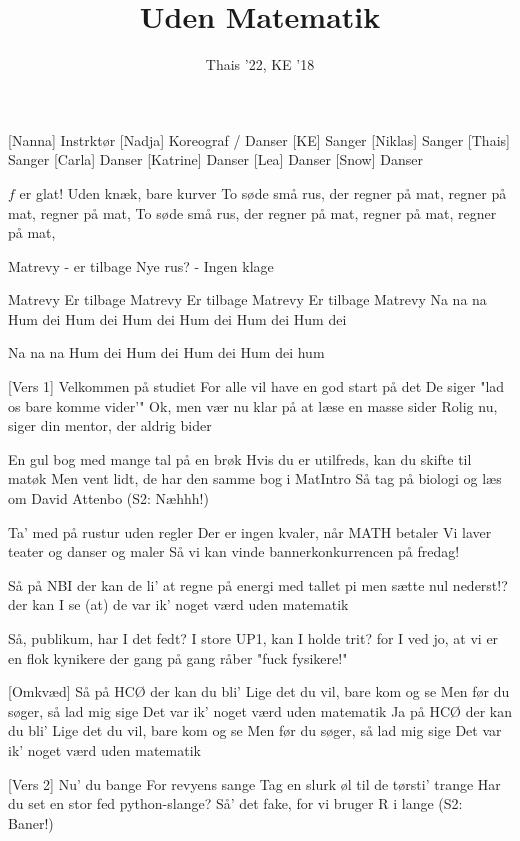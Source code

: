 \documentclass[a4paper,11pt]{article}
\title{Uden Matematik}
\author{Thais '22, KE '18}
\begin{document}
\maketitle

\begin{roles}
[Nanna] Instrktør
[Nadja] Koreograf / Danser
[KE] Sanger
[Niklas] Sanger
[Thais] Sanger
[Carla] Danser
[Katrine] Danser
[Lea] Danser
[Snow] Danser
\end{roles}

\begin{song}
  $f$ er glat! Uden knæk, bare kurver
  To søde små rus, der regner på mat, regner på mat, regner på mat, 
To søde små rus, der regner på mat, regner på mat, regner på mat,

%
Matrevy - er tilbage
Nye rus? - Ingen klage

Matrevy
Er tilbage
Matrevy
Er tilbage
Matrevy
Er tilbage
Matrevy
Na na na
Hum dei
Hum dei
Hum dei
Hum dei
Hum dei
Hum dei

Na na na
Hum dei
Hum dei
Hum dei
Hum dei hum

[Vers 1]%
Velkommen på studiet
For alle vil have en god start på det
De siger "lad os bare komme vider'"
Ok, men vær nu klar på at læse en masse sider
Rolig nu, siger din mentor, der aldrig bider

En gul bog med mange tal på en brøk
Hvis du er utilfreds, kan du skifte til matøk
Men vent lidt, de har den samme bog i MatIntro
Så tag på biologi og læs om David Attenbo  (S2: Næhhh!)

Ta' med på rustur uden regler
Der er ingen kvaler, når MATH betaler
Vi laver teater og danser og maler
Så vi kan vinde bannerkonkurrencen på fredag!

%
Så på NBI der kan de li'
at regne på energi med tallet pi
men sætte nul nederst!? der kan I se
(at) de var ik' noget værd uden matematik

Så, publikum, har I det fedt?
I store UP1, kan I holde trit?
for I ved jo, at vi er en flok kynikere
der gang på gang råber "fuck fysikere!"

[Omkvæd]%
Så på HCØ der kan du bli'
Lige det du vil, bare kom og se
Men før du søger, så lad mig sige
Det var ik' noget værd uden matematik
%
Ja på HCØ der kan du bli'
Lige det du vil, bare kom og se
Men før du søger, så lad mig sige
Det var ik' noget værd uden matematik

[Vers 2]%
Nu' du bange
For revyens sange 
Tag en slurk øl til de tørsti’ trange 
Har du set en stor fed python-slange? 
Så' det fake, for vi bruger R i lange  (S2: Baner!)


\end{song}
\end{document}
